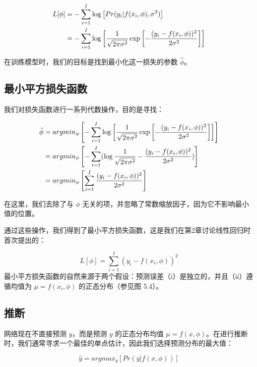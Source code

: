 \begin{align}
	L[\phi] &= - \sum_{i=1}^{I} \log \left[ Pr(y_i|f(x_i, \phi), \sigma^2) \right] \notag \\
	&= - \sum_{i=1}^{I} \log \left[ \frac{1}{\sqrt{2\pi\sigma^2}} \exp \left[ -\frac{(y_i - f(x_i, \phi))^2}{2\sigma^2} \right] \right] 
\end{align}

在训练模型时，我们的目标是找到最小化这一损失的参数 \(\hat{\phi}\)。

\subsection{最小平方损失函数}

我们对损失函数进行一系列代数操作，目的是寻找：


\begin{align}
	\hat{\phi} &= argmin_{\phi} \left[ -\sum_{i=1}^{I} \log \left[ \frac{1}{\sqrt{2\pi\sigma^2}} \exp \left[ -\frac{(y_i - f(x_i, \phi))^2}{2\sigma^2} \right] \right] \right] \notag \\
	&= argmin_{\phi} \left[ -\sum_{i=1}^{I} ( \log \frac{1}{\sqrt{2\pi\sigma^2}} - \frac{(y_i - f(x_i, \phi))^2}{2\sigma^2} ) \right] \notag \\
	&= argmin_{\phi} \left[ \sum_{i=1}^{I} \frac{(y_i - f(x_i, \phi))^2}{2\sigma^2} \right] 
\end{align}

在这里，我们去除了与 \(\phi\) 无关的项，并忽略了常数缩放因子，因为它不影响最小值的位置。

通过这些操作，我们得到了最小平方损失函数，这是我们在第2章讨论线性回归时首次提出的：

\begin{equation}
L[\phi] = \sum_{i=1}^{I} (y_i - f(x_i, \phi))^2 
\end{equation}
最小平方损失函数的自然来源于两个假设：预测误差（i）是独立的，并且（ii）遵循均值为 \(\mu = f(x_i, \phi)\) 的正态分布（参见图 5.4）。


\subsection{推断}

网络现在不直接预测 \(y\)，而是预测 \(y\) 的正态分布均值 \(\mu = f(x, \phi)\)。在进行推断时，我们通常寻求一个最佳的单点估计，因此我们选择预测分布的最大值：

\begin{equation}
\hat{y} = argmax_y [Pr(y|f(x, \phi))] 
\end{equation}


